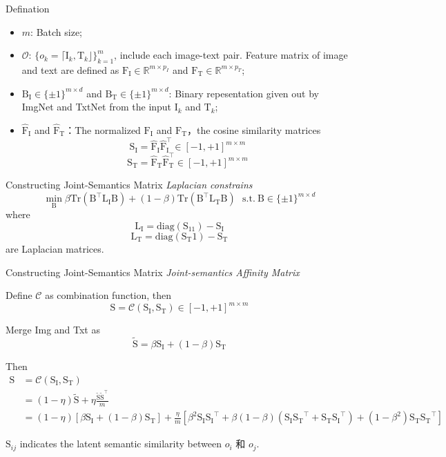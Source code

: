 \documentclass[serif]{beamer}
\begin{document}
\begin{frame}{Defination}
\begin{itemize}
 \item $m$: Batch size;
 \item $\mathcal{O}$: $\{o_k = \lceil \mathrm{I}_k, \mathrm{T}_k \rfloor\}_{k = 1}^m$, include each image-text pair. Feature matrix of image and text are defined as  $\mathrm{F}_\mathrm{I} \in \mathbb{R}^{m \times p_I}$ and $\mathrm{F}_\mathrm{T} \in \mathbb{R}^{m \times p_T}$;
 \item $\mathrm{B}_\mathrm{I} \in \{\pm1\}^{m\times d}$ and $\mathrm{B}_\mathrm{T} \in \{\pm1\}^{m\times d}$: Binary repesentation given out by ImgNet and TxtNet from the input $\mathrm{I}_k$ and $\mathrm{T}_k$;
 \item $\hat{\mathrm{F}}_\mathrm{I}$ and $\hat{\mathrm{F}}_\mathrm{T}$：The normalized $\mathrm{F}_\mathrm{I}$ and $\mathrm{F}_\mathrm{T}$，the cosine similarity matrices
$$
\mathrm{S}_\mathrm{I} = \hat{\mathrm{F}}_\mathrm{I}\hat{\mathrm{F}}_\mathrm{I}^\top \in [-1, +1]^{m \times m} 
$$
$$
\mathrm{S}_\mathrm{T} = \hat{\mathrm{F}}_\mathrm{T}\hat{\mathrm{F}}_\mathrm{T}^\top \in [-1, +1]^{m \times m}
$$
\end{itemize}
\end{frame}

\begin{frame}{Constructing Joint-Semantics Matrix}
\emph{Laplacian constrains}
$$
\min_{\mathrm{B}} \beta \mathrm{Tr}(\mathrm{B}^\top\mathrm{L_I}\mathrm{B}) + (1 - \beta)\mathrm{Tr}(\mathrm{B}^\top\mathrm{L_T}\mathrm{B})~~~\mathrm{s.t.}~ \mathrm{B} \in \{\pm1\}^{m \times d}
$$
where
$$
\mathrm{L_I} = \mathrm{diag}(\mathrm{S_11}) - \mathrm{S_I}
$$
$$
\mathrm{L_T} = \mathrm{diag}(\mathrm{S_T1}) - \mathrm{S_T}
$$
are Laplacian matrices.
\end{frame}

\begin{frame}{Constructing Joint-Semantics Matrix}
\emph{Joint-semantics Affinity Matrix}

Define $\mathcal{C}$ as combination function, then
$$
\mathrm{S} = \mathcal{C}(\mathrm{S_I}, \mathrm{S_T}) \in [-1, +1]^{m \times m}
$$

Merge Img and Txt as
$$
\tilde{\mathrm{S}} = \beta \mathrm{S_I} + (1 - \beta) \mathrm{S_T}
$$

Then
$$
\begin{aligned}
\mathrm{S} &= \mathcal{C}(\mathrm{S_I}, \mathrm{S_T}) \\
&= (1 - \eta) \tilde{\mathrm{S}} + \eta \frac{\tilde{\mathrm{S}}\tilde{\mathrm{S}}^\top}{m} \\
&= (1 - \eta)[\beta \mathrm{S_I} + (1 - \beta)\mathrm{S_T}] + \frac{\eta}{m}[\beta^2\mathrm{S_I}\mathrm{S_I}^\top + \beta(1 - \beta)(\mathrm{S_I}\mathrm{S_T}^\top + \mathrm{S_T}\mathrm{S_I}^\top) + (1 - \beta^2)\mathrm{S_T}\mathrm{S_T}^\top]
\end{aligned}
$$

$\mathrm{S}_{ij}$ indicates the latent semantic similarity between $o_i$ 和 $o_j$.
\end{frame}
\end{document}
